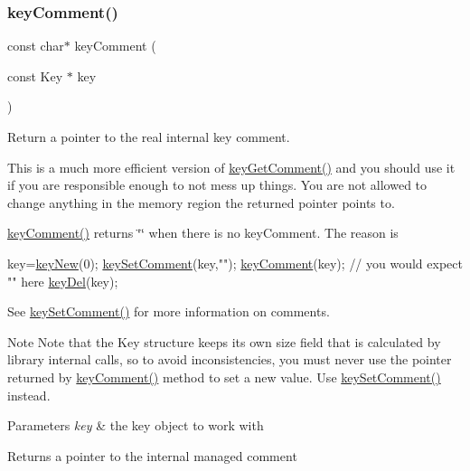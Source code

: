 \subsubsection{\texorpdfstring{key\+Comment()}{keyComment()}}
{\footnotesize\ttfamily const char$\ast$ key\+Comment (\begin{DoxyParamCaption}\item[{const Key $\ast$}]{key }\end{DoxyParamCaption})}



Return a pointer to the real internal {\ttfamily key} comment. 

This is a much more efficient version of \hyperlink{group__meta_gafb89735689929ff717cc9f2d0d0b46a2}{key\+Get\+Comment()} and you should use it if you are responsible enough to not mess up things. You are not allowed to change anything in the memory region the returned pointer points to.

\hyperlink{group__meta_gac89fd319783b3457db45b4c09e55274a}{key\+Comment()} returns \char`\"{}\char`\"{} when there is no key\+Comment. The reason is 
\begin{DoxyCode}
key=\hyperlink{group__key_gad23c65b44bf48d773759e1f9a4d43b89}{keyNew}(0);
\hyperlink{group__meta_ga8863a877a84fa46e6017fe72e49b89c1}{keySetComment}(key,\textcolor{stringliteral}{""});
\hyperlink{group__meta_gac89fd319783b3457db45b4c09e55274a}{keyComment}(key); \textcolor{comment}{// you would expect "" here}
\hyperlink{group__key_ga3df95bbc2494e3e6703ece5639be5bb1}{keyDel}(key);
\end{DoxyCode}


See \hyperlink{group__meta_ga8863a877a84fa46e6017fe72e49b89c1}{key\+Set\+Comment()} for more information on comments.

\begin{DoxyNote}{Note}
Note that the Key structure keeps its own size field that is calculated by library internal calls, so to avoid inconsistencies, you must never use the pointer returned by \hyperlink{group__meta_gac89fd319783b3457db45b4c09e55274a}{key\+Comment()} method to set a new value. Use \hyperlink{group__meta_ga8863a877a84fa46e6017fe72e49b89c1}{key\+Set\+Comment()} instead.
\end{DoxyNote}

\begin{DoxyParams}{Parameters}
{\em key} & the key object to work with \\
\hline
\end{DoxyParams}
\begin{DoxyReturn}{Returns}
a pointer to the internal managed comment 
\end{DoxyReturn}

